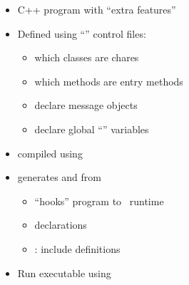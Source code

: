 \begin{frame}[fragile] 
\secframetitle{\ssCharm}

         

\begin{itemize}
\item C++ program with ``extra features''
\item Defined using ``'' control files: 
\begin{itemize}
\item which classes are chares
\item which methods are entry methods
\item declare message objects
\item declare global ``'' variables
\end{itemize}
\item compiled using 
\item generates  and  from 
\begin{itemize}
\item ``hooks'' program to \charm\ runtime
\item {} declarations
\item {}: include definitions
\end{itemize}
\item Run executable using 
\end{itemize}
\end{frame}
